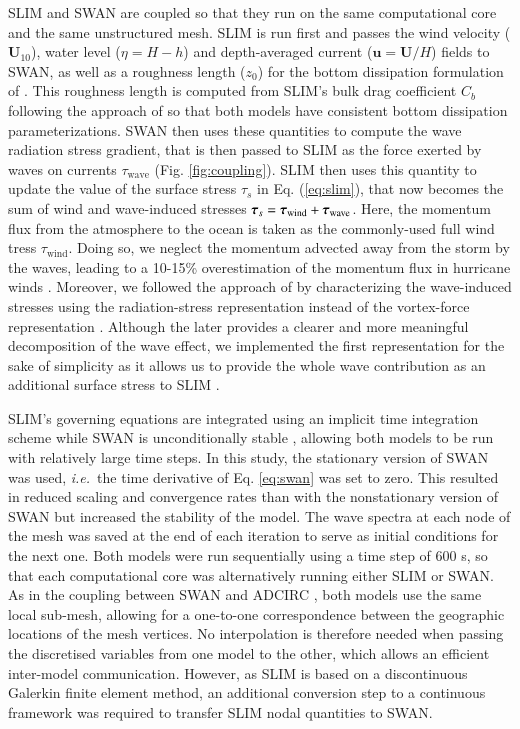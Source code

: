 \documentclass[preprint,12pt,authoryear]{elsarticle}
\newcommand{\ie}{{\it i.e.}\ }
\begin{document}
SLIM and SWAN are coupled so that they run on the same computational core and the same unstructured mesh. SLIM is run first and passes the wind velocity ($\mathbf{U}_{10}$), water level ($\eta=H-h$) and depth-averaged current ($\mathbf{u}=\mathbf{U}/H$) fields to SWAN, as well as a roughness length ($z_0$) for the bottom dissipation formulation of \cite{madsen1989spectral}. This roughness length is computed from SLIM's bulk drag coefficient $C_b$ following the approach of \cite{dietrich2011hurricane} so that both models have consistent bottom dissipation parameterizations. SWAN then uses these quantities to compute the wave radiation stress gradient, that is then passed to SLIM as the force exerted by waves on currents {\boldmath$\tau$}$_\text{wave}$ (Fig. \ref{fig:coupling}). SLIM then uses this quantity to update the value of the surface stress {\boldmath$\tau$}$_s$ in Eq. (\ref{eq:slim}), that now becomes the sum of wind and wave-induced stresses $\text{\boldmath$\tau$}_s = \text{\boldmath$\tau$}_\text{wind}+\text{\boldmath$\tau$}_\text{wave}$. Here, the momentum flux from the atmosphere to the ocean is taken as the commonly-used full wind tress {\boldmath$\tau$}$_\text{wind}$. Doing so, we neglect the momentum advected away from the storm by the waves, leading to a 10-15\% overestimation of the momentum flux in hurricane winds \citep{curcic2015explicit}. Moreover, we followed the approach of \cite{dietrich2012performance} by characterizing the wave-induced stresses using the radiation-stress representation instead of the vortex-force representation \citep{mcwilliams2004asymptotic}. Although the later provides a clearer and more meaningful decomposition of the wave effect, we implemented the first representation for the sake of simplicity as it allows us to provide the whole wave contribution as an additional surface stress to SLIM \citep{lane2007wave}.

SLIM's governing equations are integrated using an implicit time integration scheme while SWAN is unconditionally stable \citep{dietrich2012performance}, allowing both models to be run with relatively large time steps. In this study, the stationary version of SWAN was used, \ie the time derivative of Eq. \ref{eq:swan} was set to zero. This resulted in reduced scaling and convergence rates than with the nonstationary version of SWAN but increased the stability of the model. The wave spectra at each node of the mesh was saved at the end of each iteration to serve as initial conditions for the next one. Both models were run sequentially using a time step of 600 s, so that each computational core was alternatively running either SLIM or SWAN. As in the coupling between SWAN and ADCIRC \citep{dietrich2012performance}, both models use the same local sub-mesh, allowing for a one-to-one correspondence between the geographic locations of the mesh vertices. No interpolation is therefore needed when passing the discretised variables from one model to the other, which allows an efficient inter-model communication. However, as SLIM is based on  a discontinuous Galerkin finite element method, an additional conversion step to a continuous framework was required to transfer SLIM nodal quantities to SWAN.  
\end{document}

